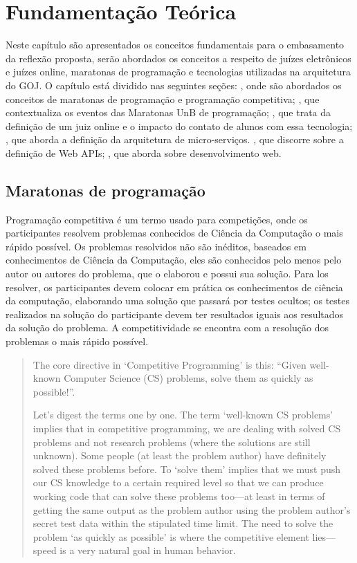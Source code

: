 \chapter[Fundamentação Teórica]{Fundamentação Teórica}
\label{chap:ft}

Neste capítulo são apresentados os conceitos fundamentais para o embasamento da reflexão proposta, serão abordados os conceitos a respeito de juízes eletrônicos e juízes online, maratonas de programação e tecnologias utilizadas na arquitetura do GOJ. O capítulo está dividido nas seguintes seções: , onde são abordados os conceitos de maratonas de programação e programação competitiva; , que contextualiza os eventos das Maratonas UnB de programação; , que trata da definição de um juiz online e o impacto do contato de alunos com essa tecnologia; , que aborda a definição da arquitetura de micro-serviços. , que discorre sobre a definição de Web APIs; , que aborda sobre desenvolvimento web. 


\section{Maratonas de programação}
\label{sec:maratonasDeProgramação}

Programação competitiva é um termo usado para competições, onde os participantes resolvem problemas conhecidos de Ciência da Computação o mais rápido possível. Os problemas resolvidos não são inéditos, baseados em conhecimentos de Ciência da Computação, eles são conhecidos pelo menos pelo autor ou autores do problema, que o elaborou e possui sua solução. Para los resolver, os participantes devem colocar em prática os conhecimentos de ciência da computação, elaborando uma solução que passará por testes ocultos; os testes realizados na solução do participante devem ter resultados iguais aos resultados da solução do problema. A competitividade se encontra com a resolução dos problemas o mais rápido possível.

\begin{quote}

The core directive in ‘Competitive Programming’ is this: “Given well-known Computer Science (CS) problems, solve them as quickly as possible!”.

Let’s digest the terms one by one. The term ‘well-known CS problems’ implies that in competitive programming, we are dealing with solved CS problems and not research problems (where the solutions are still unknown). Some people (at least the problem author) have definitely solved these problems before. To ‘solve them’ implies that we must push our CS knowledge to a certain required level so that we can produce working code that can solve these problems too—at least in terms of getting the same output as the problem author using the problem author’s secret test data within the stipulated time limit. The need to solve the problem ‘as quickly as possible’ is where the competitive element lies—speed is a very natural goal in human behavior.
\cite[p.1]{halim2013competitive}
\end{quote}

